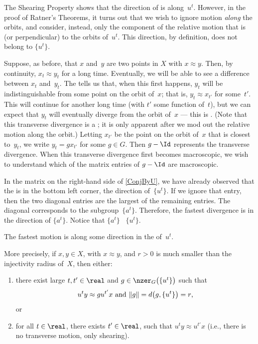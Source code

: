 The Shearing Property  shows that the direction of  is along~$u^t$. However, in the
proof of Ratner's Theorems, it turns out that we wish to ignore
motion \emph{along} the orbits, and consider, instead, only the
component of the relative motion that is
 (or perpendicular) to the
orbits of~$u^t$. This direction, by definition, does not belong to
$\{u^t\}$. 

\begin{defn}
Suppose, as before, that $x$ and~$y$ are two points in
$X$ with $x \approx y$. Then, by continuity, $x_t \approx
y_t$ for a long time. Eventually, we will be able to see a difference
between $x_t$ and~$y_t$. The   tells us that, when
this first happens, $y_t$ will be indistinguishable from some point on the
orbit of~$x$; that is, $y_t \approx x_{t'}$ for some~$t'$. This will
continue for another long time (with $t'$ some function of~$t$), but we can
expect that $y_t$ will eventually diverge from the orbit of~$x$ --- this
is . (Note that this
transverse divergence is a ; it is only apparent after we mod out the relative motion along
the orbit.) Letting $x_{t'}$ be the point on the orbit of~$x$ that is
closest to~$y_t$, we write $y_t = g x_{t'}$ for some $g \in G$. Then $g -
\Id$ represents the transverse divergence. When this transverse divergence
first becomes macroscopic, we wish to understand which of the matrix
entries of $g - \Id$ are macroscopic.
 \end{defn}

 In the matrix on the right-hand side of \cref{ConjByU}, we have already observed
that the  is in the bottom left corner,
the direction of~$\{u^t\}$. If we ignore that entry, then the two diagonal
entries are the largest of the remaining entries. The diagonal corresponds to the
subgroup~$\{a^t\}$. Therefore, the fastest
 divergence is in the
direction of $\{a^t\}$. Notice that $\{a^t\}$
~$\{u^t\}$.


\begin{prop} \label{High1DTransN}
 The fastest  motion is
along some direction in the  of~$u^t$.

More precisely, if $x,y \in X$, with $x \approx y$, and $r > 0$ is much smaller than the injectivity radius of~$X$, then either:
	\begin{enumerate}
	\item there exist large $t,t' \in \real$ and $g \in \nzer_G\bigl( \{u^t\} \bigr)$ such that
	$$ \text{$u^t y \approx g u^{t'} x$ and\/ $\| g \| = d \bigl(g, \{u^t\} \bigr) = r$,} $$
	or
	\item for all $t \in \real$, there exists $t' \in \real$, such that $u^t y \approx u^{t'} x$ \textup(i.e., there is no transverse motion, only shearing\textup).
	\end{enumerate}
 \end{prop}

